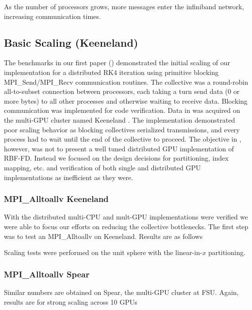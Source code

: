 \documentclass{report}
\begin{document}
As the number of processors grows, more messages enter the infiniband network, increasing communication times. 



\subsection{Basic Scaling (Keeneland)}



The benchmarks in our first paper (\cite{BolligFlyerErlebacher2012}) demonstrated the initial scaling of our implementation for a distributed RK4 iteration using primitive blocking MPI\_Send/MPI\_Recv communication routines. The collective was a round-robin all-to-subset connection between processors, each taking a turn send data (0 or more bytes) to all other processes and otherwise waiting to receive data. Blocking communication was implemented for code verification. Data in \cite{BolligFlyerErlebacher2012} was acquired on the multi-GPU cluster named Keeneland \cite{Vetter2011}. The implementation demonstrated poor scaling behavior as blocking collectives serialized transmissions, and every process had to wait until the end of the collective to proceed. The objective in \cite{BolligFlyerErlebacher2012}, however, was not to present a well tuned distributed GPU implementation of RBF-FD. Instead we focused on the design decisions for partitioning, index mapping, etc. and verification of both single and distributed GPU implementations as inefficient as they were. 


\subsubsection{MPI\_Alltoallv Keeneland}
With the distributed multi-CPU and mult-GPU implementations were verified we were able to focus our efforts on reducing the collective bottlenecks. The first step was to test an MPI\_Alltoallv on Keeneland. Results are as follows

Scaling tests were performed on the unit sphere with the linear-in-$x$ partitioning. 



\subsubsection{MPI\_Alltoallv Spear}
Similar numbers are obtained on Spear, the multi-GPU cluster at FSU. Again, results are for strong scaling across 10 GPUs
\end{document}
